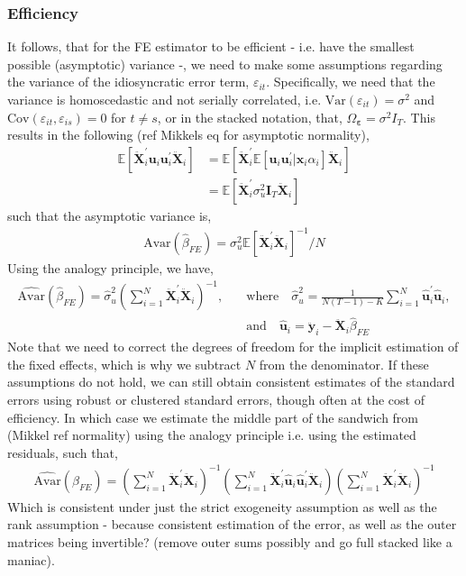 \subsubsection*{Efficiency}

It follows, that for the FE estimator to be efficient - i.e. have the smallest possible (asymptotic) variance -, we need to make some assumptions regarding the variance of the idiosyncratic error term, $\varepsilon_{it}$. Specifically, we need that the variance is homoscedastic and not serially correlated, i.e. $\text{Var}(\varepsilon_{it}) = \sigma^2$ and $\text{Cov}(\varepsilon_{it}, \varepsilon_{is}) = 0$ for $t \neq s$, or in the stacked notation, that, $\Omega_{\bm{\varepsilon}} = \sigma^2 I_T$. This results in the following (ref Mikkels eq for asymptotic normality), 
\begin{align*}
    \mathbb{E}\left[ \bm{\ddot{X}}_i^\prime \bm{u}_i \bm{u}_i^\prime \bm{\ddot{X}}_i \right] &= \mathbb{E}\left[ \bm{\ddot{X}}_i^\prime \mathbb{E}[\bm{u}_i \bm{u}_i^\prime | \bm{x}_i \alpha_i]\bm{\ddot{X}}_i \right] \\
    &= \mathbb{E}[\ddot{\bm{X}}_i^\prime \sigma_u^2 \bm{I}_T \bm{\ddot{X}}_i]
\end{align*}
such that the asymptotic variance is,
\begin{align*}
    \text{Avar}(\hat{\beta}_{FE}) = \sigma_u^2 \mathbb{E}[\bm{\ddot{X}}_i^\prime \bm{\ddot{X}}_i]^{-1} / N
\end{align*}
Using the analogy principle, we have, 
\begin{align*}
    \hat{\text{Avar}}(\hat{\beta}_{FE}) = \hat{\sigma}_u^2 \left( \sum_{i=1}^N \bm{\ddot{X}}_i^\prime \bm{\ddot{X}}_i \right)^{-1}, \quad &\text{where} \quad \hat{\sigma}_u^2 = \frac{1}{N(T-1) - K} \sum_{i=1}^N \hat{\bm{u}}_i^\prime \hat{\bm{u}}_i, \\
    &\text{and} \quad \hat{\bm{u}}_i = \bm{\ddot{y}}_i - \bm{\ddot{X}}_i \hat{\beta}_{FE}
\end{align*}
Note that we need to correct the degrees of freedom for the implicit estimation of the fixed effects, which is why we subtract $N$ from the denominator. If these assumptions do not hold, we can still obtain consistent estimates of the standard errors using robust or clustered standard errors, though often at the cost of efficiency. In which case we estimate the middle part of the sandwich from (Mikkel ref normality) using the analogy principle i.e. using the estimated residuals, such that, 
\begin{align*}
    \hat{\text{Avar}}(\hat{\beta}_{FE}) = \left( \sum_{i=1}^N \bm{\ddot{X}}_i^\prime \bm{\ddot{X}}_i \right)^{-1} \left( \sum_{i=1}^N \bm{\ddot{X}}_i^\prime \hat{\bm{u}}_i \hat{\bm{u}}_i^\prime \bm{\ddot{X}}_i \right) \left( \sum_{i=1}^N \bm{\ddot{X}}_i^\prime \bm{\ddot{X}}_i \right)^{-1}
\end{align*} 
Which is consistent under just the strict exogeneity assumption as well as the rank assumption - because consistent estimation of the error, as well as the outer matrices being invertible? (remove outer sums possibly and go full stacked like a maniac). 